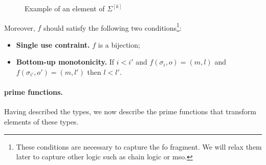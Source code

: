 \begin{definition}[Types]
\begin{itemize}
\begin{enumerate}
\begin{figure}

\caption{Example of an element of $\Sigma^{[k]}$\label{FigMatrixPower}}
\end{figure}

Moreover, $f$ should satisfy the following two conditions\footnote{These conditions are necessary to capture the fo fragment. We will relax them later to capture other logic such as chain logic or mso.}:
\begin{itemize}
\item {\bf Single use contraint.} $f$ is a bijection;
\item  {\bf Bottom-up monotonicity.} If $i<i'$ and $f(\sigma_i, o)=(m,l)$ and $f(\sigma_{i'},o')=(m,l')$ then $l<l'$. 
\end{itemize}

%
    \end{enumerate}  
    \end{itemize}  
\end{definition}

\newcommand{\tensorpair}[2]{\langle #1, #2 \rangle}



\paragraph*{prime functions.} Having described the types, we now describe the prime functions that transform elements of these types.




